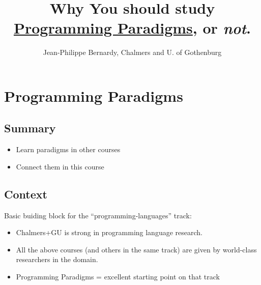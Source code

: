\documentclass[utf8,compress,hyperref]{beamer}
\title[Study ProgPar in SP 3 (Jan-Mar)!]{Why You should
  study\\\href{http://www.student.chalmers.se/sp/course?course_code=TDA342}{Programming
    Paradigms}, or \emph{not}.}
\author[JP Bernardy, Chalmers and GU]{Jean-Philippe Bernardy, Chalmers and U. of Gothenburg}
\begin{document}
\section{Programming Paradigms}
\subsection{Summary}
\begin{frame}
\maketitle
\begin{itemize}
\item Learn paradigms in other courses
\item Connect them in this course
\end{itemize}

\end{frame}

\subsection{Context}
\begin{frame}

Basic buiding block for the ``programming-languages'' track:

\hspace{2cm}

\begin{itemize}
\item Chalmers+GU is strong in programming language research.
\item All the above courses (and others in the same track) are given
  by world-class researchers in the domain.
\item Programming Paradigms = excellent starting point on that track
\end{itemize}

\end{frame}
\end{document}
